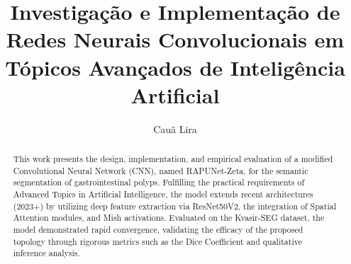 ﻿\documentclass[runningheads]{llncs}
\begin{document}
\title{Investiga\c{c}\~{a}o e Implementa\c{c}\~{a}o de Redes Neurais Convolucionais em T\'{o}picos Avan\c{c}ados de Intelig\^{e}ncia Artificial}

\author{Cau\~{a} Lira}


\maketitle

\begin{abstract}
This work presents the design, implementation, and empirical evaluation of a modified Convolutional Neural Network (CNN), named RAPUNet-Zeta, for the semantic segmentation of gastrointestinal polyps. Fulfilling the practical requirements of Advanced Topics in Artificial Intelligence, the model extends recent architectures (2023+) by utilizing deep feature extraction via ResNet50V2, the integration of Spatial Attention modules, and Mish activations. Evaluated on the Kvasir-SEG dataset, the model demonstrated rapid convergence, validating the efficacy of the proposed topology through rigorous metrics such as the Dice Coefficient and qualitative inference analysis.

\end{abstract}









\end{document}
